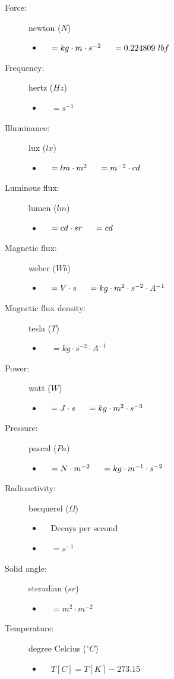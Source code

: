 \documentclass[]{report}
\newcommand \tab[1][1cm]{\hspace*{#1}}
\newcommand{\items}{\item\ \ }
\newcommand{\degrees}{^{\circ}}
\begin{document}
\begin{description}
\item[Force:] newton ($N$)
\begin{itemize}
\items $= kg \cdot m \cdot s^{-2} \tab[0.5cm] = 0.224809\ lbf$
\end{itemize}	

\item[Frequency:] hertz ($Hz$)
\begin{itemize}
\items $=s^{-1}$
\end{itemize}				

\item[Illuminance:] lux ($lx$)
\begin{itemize}
\items $= lm\cdot m^{2} \tab[0.5cm]= m^{-2} \cdot cd$
\end{itemize}							

\item[Luminous flux:] lumen ($lm$)
\begin{itemize}
\items $= cd \cdot sr \tab[0.5cm]= cd$
\end{itemize}				

\item[Magnetic flux:] weber ($Wb$)
\begin{itemize}
\items $= V \cdot s \tab[0.5cm]= kg \cdot m^2 \cdot s^{-2} \cdot A^{-1}$
\end{itemize}				

\item[Magnetic flux density:] tesla ($T$)
\begin{itemize}
\items $= kg \cdot s^{-2} \cdot A^{-1}$
\end{itemize}				

\item[Power:] watt ($W$)
\begin{itemize}
\items $= J \cdot s \tab[0.5cm]= kg \cdot m^2 \cdot s^{-3}$
\end{itemize}

\item[Pressure:] pascal ($Pa$)
\begin{itemize}
\items $= N\cdot m^{-2} \tab[0.5cm]= kg \cdot m^{-1} \cdot s^{-2}$
\end{itemize}

\item[Radioactivity:] becquerel ($\Omega$)
\begin{itemize}
\items Decays per second
\items $= s^{-1}$
\end{itemize}
                
\item[Solid angle:] steradian ($sr$)
\begin{itemize}
\items $ = m^2\cdot m^{-2}$
\end{itemize}

\item[Temperature:] degree Celcius ($\degrees C$)
\begin{itemize}
\items $T [C] = T [K] - 273.15$
\end{itemize}					
\end{description}			
						
\end{document}
